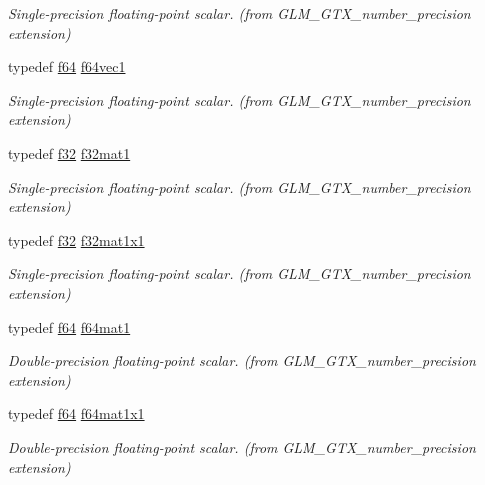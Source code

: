\begin{DoxyCompactItemize}
\begin{DoxyCompactList}\small\item\em Single-\/precision floating-\/point scalar. (from G\+L\+M\+\_\+\+G\+T\+X\+\_\+number\+\_\+precision extension) \end{DoxyCompactList}\item 
typedef \hyperlink{group__gtc__type__precision_ga2bba392e555124b36cde6abba349bab3}{f64} \hyperlink{group__gtx__number__precision_ga44336a26c958d66efdfb5a6c114c538e}{f64vec1}
\begin{DoxyCompactList}\small\item\em Single-\/precision floating-\/point scalar. (from G\+L\+M\+\_\+\+G\+T\+X\+\_\+number\+\_\+precision extension) \end{DoxyCompactList}\item 
typedef \hyperlink{group__gtc__type__precision_ga0ec999b57f5330d9021256e96038df04}{f32} \hyperlink{group__gtx__number__precision_gae5ff376ec910c360f06acc0c2b99260c}{f32mat1}
\begin{DoxyCompactList}\small\item\em Single-\/precision floating-\/point scalar. (from G\+L\+M\+\_\+\+G\+T\+X\+\_\+number\+\_\+precision extension) \end{DoxyCompactList}\item 
typedef \hyperlink{group__gtc__type__precision_ga0ec999b57f5330d9021256e96038df04}{f32} \hyperlink{group__gtx__number__precision_ga01caec78388a82a9a22bd45e5751a38a}{f32mat1x1}
\begin{DoxyCompactList}\small\item\em Single-\/precision floating-\/point scalar. (from G\+L\+M\+\_\+\+G\+T\+X\+\_\+number\+\_\+precision extension) \end{DoxyCompactList}\item 
typedef \hyperlink{group__gtc__type__precision_ga2bba392e555124b36cde6abba349bab3}{f64} \hyperlink{group__gtx__number__precision_ga23f8f53c78b50aa07a113c3d07d01bc9}{f64mat1}
\begin{DoxyCompactList}\small\item\em Double-\/precision floating-\/point scalar. (from G\+L\+M\+\_\+\+G\+T\+X\+\_\+number\+\_\+precision extension) \end{DoxyCompactList}\item 
typedef \hyperlink{group__gtc__type__precision_ga2bba392e555124b36cde6abba349bab3}{f64} \hyperlink{group__gtx__number__precision_ga710a5952d78b22635c71c5fc2c0a3319}{f64mat1x1}
\begin{DoxyCompactList}\small\item\em Double-\/precision floating-\/point scalar. (from G\+L\+M\+\_\+\+G\+T\+X\+\_\+number\+\_\+precision extension) \end{DoxyCompactList}\end{DoxyCompactItemize}
